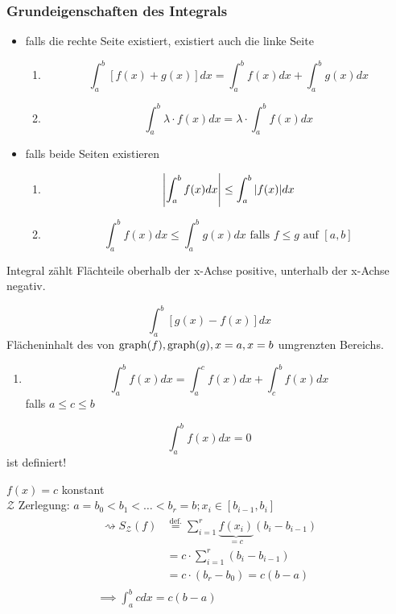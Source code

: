 \subsubsection{Grundeigenschaften des Integrals}
\begin{itemize}
	\item falls die rechte Seite existiert, existiert auch die linke Seite
		\begin{enumerate}[label=(\alph*)]
			\item \[ \int_a^b [f(x) + g(x)] dx = \int_a^b f(x) dx + \int_a^b g(x) dx \]
			\item \[ \int_a^b \lambda \cdot f(x) dx = \lambda \cdot \int_a^b f(x) dx \]
		\end{enumerate}
	\item falls beide Seiten existieren
		\begin{enumerate}[label=(\alph*) , resume]
			\item \[ \abs{\int_a^b f(x) dx} \leq \int_a^b \abs{f(x)} dx \]
			\item \[ \int_a^b f(x) dx \leq \int_a^b g(x) dx \text{ falls } f \leq g \text{ auf } [a,b] \]
		\end{enumerate}
\end{itemize}
\begin{bem}[note = zu (c)]
	Integral zählt Flächteile oberhalb der x-Achse positive, unterhalb der x-Achse negativ.
\end{bem}
\begin{bem}[note = zu (d)]
	\[ \int_a^b [g(x) - f(x)] dx \]
	Flächeninhalt des von $\operatorname{graph}(f) , \operatorname{graph}(g) , x=a , x=b$ umgrenzten Bereichs.
\end{bem}
\begin{enumerate}[label=(\alph*) , start=5]
	\item \[ \int_a^b f(x) dx = \int_a^c f(x) dx + \int_c^b f(x) dx \]
	falls $a \leq c \leq b$
\end{enumerate}
\begin{bem}
	\[ \int_a^b f(x) dx = 0 \]
	ist definiert!
\end{bem}
\begin{bsp}
	$f(x) = c$ konstant \\
	$\mathcal{Z}$ Zerlegung: $a = b_0 < b_1 < \dots < b_r = b ; x_i \in [b_{i-1} , b_i]$
	\begin{gather*}
		\begin{split}
			\rightsquigarrow S_{\mathcal{Z}}(f)	&\overset{\text{def.}}{=} \sum_{i=1}^r \underbrace{f(x_i)}_{=c} (b_i - b_{i-1}) \\
										&= c \cdot \sum_{i=1}^r (b_i - b_{i-1}) \\
										&= c \cdot (b_r - b_0) = c ( b-a )
		\end{split} \\
		\implies \int_a^b c dx = c (b-a)
	\end{gather*}
\end{bsp}
